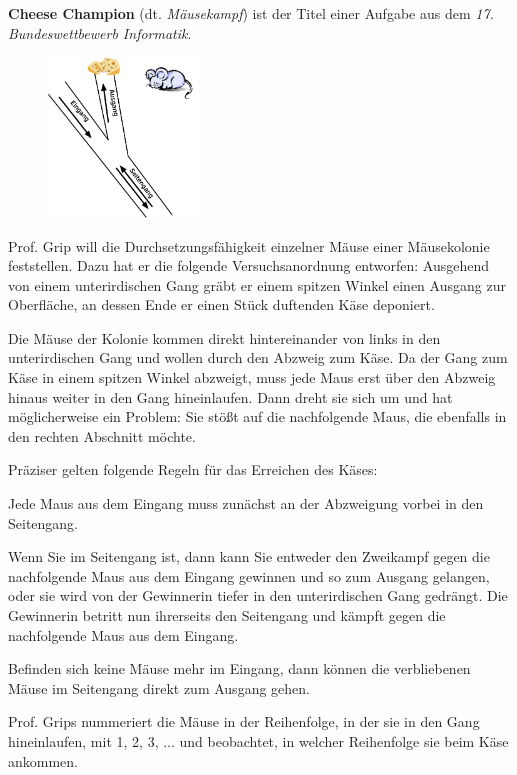 \documentclass[10pt, a4paper, ngerman]{arbeitsblatt}
\begin{document}
\ReiheTitel

\textbf{Cheese Champion} (dt. \emph{Mäusekampf}) ist der Titel einer Aufgabe aus dem \emph{17. Bundeswettbewerb Informatik}.
\begin{rahmen}\small
\begin{wrapfix}
	\begin{figure}
		\includegraphics[width=4cm]{Q1-AB.II.06-Cheese_Champion.png}
	\end{figure}

	Prof. Grip will die Durchsetzungsfähigkeit einzelner Mäuse einer Mäusekolonie feststellen. Dazu hat er die folgende Versuchsanordnung entworfen: Ausgehend von einem unterirdischen Gang gräbt er einem spitzen Winkel einen Ausgang zur Oberfläche, an dessen Ende er einen Stück duftenden Käse deponiert.

	Die Mäuse der Kolonie kommen direkt hintereinander von links in den unterirdischen Gang und wollen durch den Abzweig zum Käse. Da der Gang zum Käse in einem spitzen Winkel abzweigt, muss jede Maus erst über den Abzweig hinaus weiter in den Gang hineinlaufen. Dann dreht sie sich um und hat möglicherweise ein Problem: Sie stößt auf die nachfolgende Maus, die ebenfalls in den rechten Abschnitt möchte.

	Präziser gelten folgende Regeln für das Erreichen des Käses:
	\begin{smallitem}
		\item Jede Maus aus dem Eingang muss zunächst an der Abzweigung vorbei in den Seitengang.
		\item Wenn Sie im Seitengang ist, dann kann Sie entweder den Zweikampf gegen die nachfolgende Maus aus dem Eingang gewinnen und so zum Ausgang gelangen, oder sie wird von der Gewinnerin tiefer in den unterirdischen Gang gedrängt. Die Gewinnerin betritt nun ihrerseits den Seitengang und kämpft gegen die nachfolgende Maus aus dem Eingang.
		\item Befinden sich keine Mäuse mehr im Eingang, dann können die verbliebenen Mäuse im Seitengang direkt zum Ausgang gehen.
	\end{smallitem}

	Prof. Grips nummeriert die Mäuse in der Reihenfolge, in der sie in den Gang hineinlaufen, mit 1, 2, 3, ... und beobachtet, in welcher Reihenfolge sie beim Käse ankommen.
\end{wrapfix}
\end{rahmen}
\end{document}
